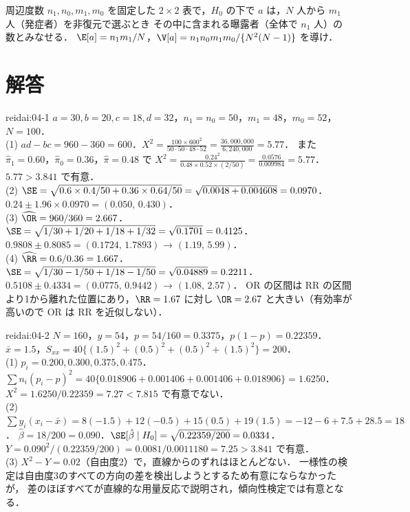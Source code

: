 \begin{reidai}[超幾何分布の分散の導出]\label{reidai:04-4}
周辺度数 $n_1,n_0,m_1,m_0$ を固定した $2\times2$ 表で，$H_0$ の下で $a$ は，$N$ 人から $m_1$ 人（発症者）を非復元で選ぶとき
その中に含まれる曝露者（全体で $n_1$ 人）の数とみなせる．
$\E[a]=n_1m_1/N$，$\V[a]=n_1n_0m_1m_0/\{N^2(N-1)\}$ を導け．
\end{reidai}

\section{解答}\label{sec:04-sol}
\begin{kaitou}{reidai:04-1}
$a=30,b=20,c=18,d=32$，$n_1=n_0=50$，$m_1=48$，$m_0=52$，$N=100$．\\
(1) $ad-bc=960-360=600$．$X^2=\frac{100\times600^2}{50\cdot50\cdot48\cdot52}=\frac{36{,}000{,}000}{6{,}240{,}000}=5.77$．
また $\hat\pi_1=0.60$，$\hat\pi_0=0.36$，$\hat\pi=0.48$ で
$X^2=\frac{0.24^2}{0.48\times0.52\times(2/50)}=\frac{0.0576}{0.009984}=5.77$．$5.77>3.841$ で有意．\\
(2) $\SE=\sqrt{0.6\times0.4/50+0.36\times0.64/50}=\sqrt{0.0048+0.004608}=0.0970$．
$0.24\pm1.96\times0.0970=(0.050,\,0.430)$．\\
(3) $\widehat{\OR}=960/360=2.667$．$\SE=\sqrt{1/30+1/20+1/18+1/32}=\sqrt{0.1701}=0.4125$．
$0.9808\pm0.8085=(0.1724,\,1.7893)$ → $(1.19,\,5.99)$．\\
(4) $\widehat{\RR}=0.6/0.36=1.667$．$\SE=\sqrt{1/30-1/50+1/18-1/50}=\sqrt{0.04889}=0.2211$．
$0.5108\pm0.4334=(0.0775,\,0.9442)$ → $(1.08,\,2.57)$．
OR の区間は RR の区間より1から離れた位置にあり，$\RR=1.67$ に対し $\OR=2.67$ と大きい（有効率が高いので OR は RR を近似しない）．
\end{kaitou}

\begin{kaitou}{reidai:04-2}
$N=160$，$y=54$，$p=54/160=0.3375$，$p(1-p)=0.22359$．$\bar x=1.5$，$S_{xx}=40\{(1.5)^2+(0.5)^2+(0.5)^2+(1.5)^2\}=200$．\\
(1) $p_i=0.200,0.300,0.375,0.475$．$\sum n_i(p_i-p)^2=40\{0.018906+0.001406+0.001406+0.018906\}=1.6250$．
$X^2=1.6250/0.22359=7.27<7.815$ で有意でない．\\
(2) $\sum y_i(x_i-\bar x)=8(-1.5)+12(-0.5)+15(0.5)+19(1.5)=-12-6+7.5+28.5=18$．
$\hat\beta=18/200=0.090$．$\SE[\hat\beta\mid H_0]=\sqrt{0.22359/200}=0.0334$．
$Y=0.090^2/(0.22359/200)=0.0081/0.0011180=7.25>3.841$ で有意．\\
(3) $X^2-Y=0.02$（自由度2）で，直線からのずれはほとんどない．
一様性の検定は自由度3のすべての方向の差を検出しようとするため有意にならなかったが，
差のほぼすべてが直線的な用量反応で説明され，傾向性検定では有意となる．
\end{kaitou}

